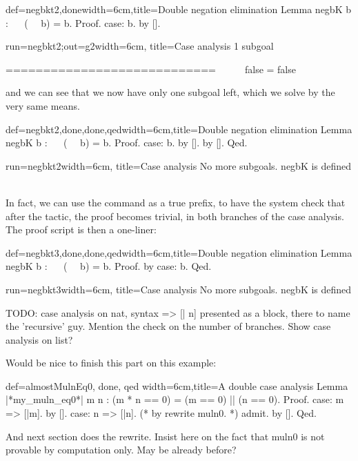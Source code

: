 \begin{coq}{def=negbkt2,done}{width=6cm,title=Double negation elimination}
Lemma negbK b : ~~ (~~ b) = b.
Proof.
case: b.
  by [].
\end{coq}
\begin{coqout}{run=negbkt2;out=g2}{width=6cm, title=Case analysis}
1 subgoal

 ============================
   ~~ ~~ false = false
\end{coqout}

and we can see that we now have only one subgoal left, which we solve
by the very same means.

\begin{coq}{def=negbkt2,done,done,qed}{width=6cm,title=Double negation elimination}
Lemma negbK b : ~~ (~~ b) = b.
Proof.
case: b.
  by [].
by [].
Qed.
\end{coq}
\begin{coqout}{run=negbkt2}{width=6cm, title=Case analysis}
No more subgoals.
negbK is defined
$~$
$~$
$~$
$~$
\end{coqout}

In fact, we can use the  command as a true prefix, to have the
system check that after the  tactic, the proof becomes
trivial, in both branches of the case analysis. The proof script is
then a one-liner:

\begin{coq}{def=negbkt3,done,done,qed}{width=6cm,title=Double negation elimination}
Lemma negbK b : ~~ (~~ b) = b.
Proof. by case: b. Qed.
\end{coq}
\begin{coqout}{run=negbkt3}{width=6cm, title=Case analysis}
No more subgoals.
negbK is defined
\end{coqout}

TODO: case analysis on nat, syntax => [| n] presented as a block,
there to name the 'recursive' guy. Mention the check on the number of
branches. Show case analysis on list?

Would be nice to finish this part on this example:

\begin{coq}{def=almostMulnEq0, done, qed}
  {width=6cm,title=A double case analysis}
Lemma |*my_muln_eq0*| m n : (m * n == 0) = (m == 0) || (n == 0).
Proof.
case: m => [|m].
  by [].
case: n => [|n].
  (* by rewrite muln0. *) admit.
by [].
Qed.
\end{coq}

And next section does the rewrite. Insist here on the fact that muln0
is not provable by computation only. May be already before?

